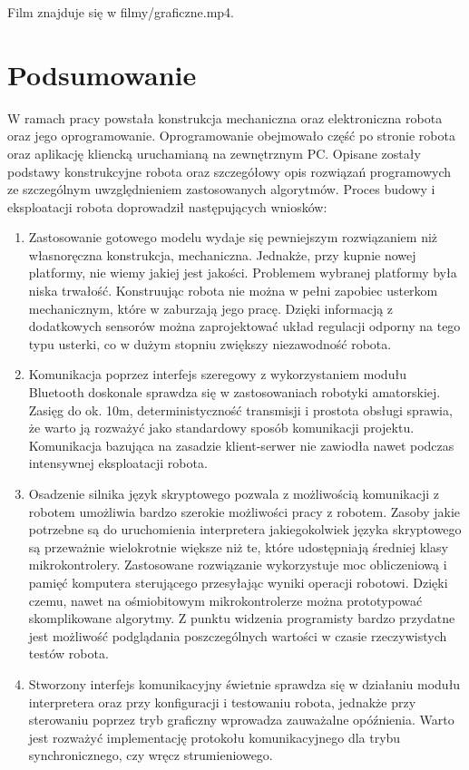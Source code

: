 \documentclass[eng,printmode]{mgr}
\begin{document}
Film znajduje się w filmy/graficzne.mp4.


\chapter{Podsumowanie}
W ramach pracy powstała konstrukcja mechaniczna oraz elektroniczna robota oraz jego oprogramowanie. Oprogramowanie obejmowało część po stronie robota oraz aplikację kliencką uruchamianą na zewnętrznym PC. Opisane zostały podstawy konstrukcyjne robota oraz szczegółowy opis rozwiązań programowych ze szczególnym uwzględnieniem zastosowanych algorytmów. Proces budowy i eksploatacji robota doprowadził następujących wniosków:
\begin{enumerate}
 \item Zastosowanie gotowego modelu wydaje się pewniejszym rozwiązaniem niż własnoręczna konstrukcja, mechaniczna. Jednakże, przy kupnie nowej platformy, nie wiemy jakiej jest jakości. Problemem wybranej platformy była niska trwałość. Konstruując robota nie można w pełni zapobiec usterkom mechanicznym, które w zaburzają jego pracę. Dzięki informacją z dodatkowych sensorów można zaprojektować układ regulacji odporny na tego typu usterki, co w dużym stopniu zwiększy niezawodność robota.
 \item Komunikacja poprzez interfejs szeregowy z wykorzystaniem modułu Bluetooth doskonale sprawdza się w zastosowaniach robotyki amatorskiej. Zasięg do ok. 10m, deterministyczność transmisji i prostota obsługi sprawia, że warto ją rozważyć jako standardowy sposób komunikacji projektu. Komunikacja bazująca na zasadzie klient-serwer nie zawiodła nawet podczas intensywnej eksploatacji robota.
 \item Osadzenie silnika język skryptowego pozwala z możliwością komunikacji z robotem umożliwia bardzo szerokie możliwości pracy z robotem. Zasoby jakie potrzebne są do uruchomienia interpretera jakiegokolwiek języka skryptowego są przeważnie wielokrotnie większe niż te, które udostępniają średniej klasy mikrokontrolery. Zastosowane rozwiązanie wykorzystuje moc obliczeniową i pamięć komputera sterującego przesyłając wyniki operacji robotowi. Dzięki czemu, nawet na ośmiobitowym mikrokontrolerze można prototypować skomplikowane algorytmy. Z punktu widzenia programisty bardzo przydatne jest możliwość podglądania poszczególnych wartości w czasie rzeczywistych testów robota.
 \item Stworzony  interfejs komunikacyjny świetnie sprawdza się w działaniu modułu interpretera oraz przy konfiguracji  i testowaniu robota, jednakże przy sterowaniu poprzez tryb graficzny wprowadza zauważalne opóźnienia. Warto jest rozważyć implementację protokołu komunikacyjnego dla trybu synchronicznego, czy wręcz strumieniowego. 
\end{enumerate}
\end{document}
